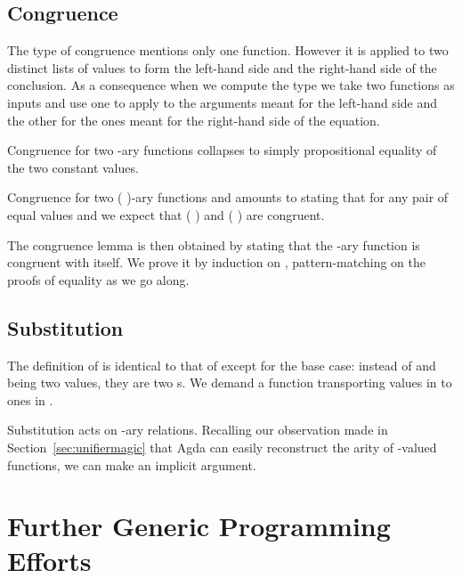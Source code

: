 {\subsection{Congruence}

The type of congruence mentions only one function. However it is applied to two
distinct lists of values to form the left-hand side and the right-hand side of
the conclusion. As a consequence when we compute the type we take two functions
as inputs and use one to apply to the arguments meant for the left-hand side
and the other for the ones meant for the right-hand side of the equation.

Congruence for two -ary functions collapses to simply propositional equality
of the two constant values.

Congruence for two ( )-ary functions  and  amounts to
stating that for any pair of equal values  and  we expect that
{( )} and {( )} are congruent.


The congruence lemma is then obtained by stating that the -ary function 
is congruent with itself. We prove it by induction on , pattern-matching on the
proofs of equality as we go along.


\subsection{Substitution}

The definition of  is identical to that of  except for the
base case: instead of  and  being two values, they are two s.
We demand a function transporting values in  to ones in .


Substitution acts on -ary relations. Recalling our observation made
in Section~\ref{sec:unifiermagic} that Agda can easily reconstruct the arity
of -valued functions, we can make  an implicit argument.




\section{Further Generic Programming Efforts}

}
